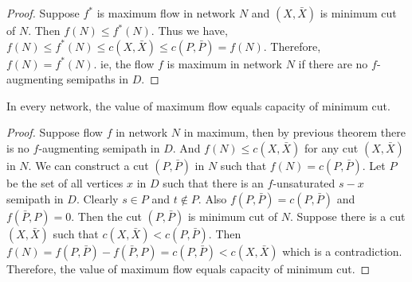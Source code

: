 \begin{proof}
	Suppose $f^*$ is maximum flow in network $N$ and $(X,\bar{X})$ is minimum cut of $N$. Then $f(N) \le f^*(N)$. Thus we have, $f(N) \le f^*(N) \le c(X,\bar{X}) \le c(P,\bar{P}) = f(N)$. Therefore, $f(N) = f^*(N)$. ie, the flow $f$ is maximum in network $N$ if there are no $f$-augmenting semipaths in $D$.
\end{proof}
\begin{theorem}
	In every network, the value of maximum flow equals capacity of minimum cut.
\end{theorem}
\begin{proof}
	Suppose flow $f$ in network $N$ in maximum, then by previous theorem there is no $f$-augmenting semipath in $D$. And $f(N) \le c(X,\bar{X})$ for any cut $(X,\bar{X})$ in $N$. We can construct a cut $(P,\bar{P})$ in $N$ such that $f(N) = c(P,\bar{P})$. Let $P$ be the set of all vertices $x$ in $D$ such that there is an $f$-unsaturated $s-x$ semipath in $D$. Clearly $s \in P$ and $t \not\in P$. Also $f(P,\bar{P}) = c(P,\bar{P})$ and $f(\bar{P},P) = 0$. Then the cut $(P,\bar{P})$ is minimum cut of $N$. Suppose there is a cut $(X,\bar{X})$ such that $c(X,\bar{X}) < c(P,\bar{P})$. Then $f(N) = f(P,\bar{P}) - f(\bar{P},P) = c(P,\bar{P}) < c(X,\bar{X})$ which is a contradiction. Therefore, the value of maximum flow equals capacity of minimum cut.
\end{proof}
